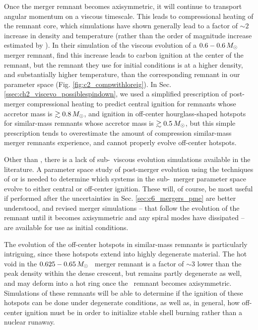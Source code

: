 Once the merger remnant becomes axisymmetric, it will continue to transport angular momentum on a viscous timescale.  This leads to compressional heating of the remnant core, which simulations \citep{schw+12, ji+13, rask+14} have shown generally lead to a factor of $\sim2$ increase in density and temperature (rather than the order of magnitude increase estimated by \citeal{vkercj10}).  In their simulation of the viscous evolution of a $0.6-0.6\,\Msun$ merger remnant, \cite{ji+13} find this increase leads to carbon ignition at the center of the remnant, but the remnant they use for initial conditions is at a higher density, and substantially higher temperature, than the corresponding remnant in our parameter space (Fig. \ref{fig:c2_compwithloreig}).  In Sec. \ref{ssec:ch2_viscevo_possiblespindown}, we used a simplified prescription of post-merger compressional heating to predict central ignition for remnants whose accretor mass is $\gtrsim0.8\,\Msun$, and ignition in off-center hourglass-shaped hotspots for similar-mass remnants whose accretor mass is $\gtrsim0.5\,\Msun$, but this simple prescription tends to overestimate the amount of compression similar-mass merger remnants experience, and cannot properly evolve off-center hotspots.

Other than \cite{ji+13}, there is a lack of sub-\Mch\ viscous evolution simulations available in the literature.  A parameter space study of post-merger evolution using the techniques of \cite{schw+12} or \cite{ji+13} is needed to determine which systems in the sub-\Mch\ merger parameter space evolve to either central or off-center ignition.  These will, of course, be most useful if performed after the uncertainties in Sec. \ref{sec:c6_mergers_pme} are better understood, and revised merger simulations -- that follow the evolution of the remnant until it becomes axisymmetric and any spiral modes have dissipated -- are available for use as initial conditions.

The evolution of the off-center hotspots in similar-mass remnants is particularly intriguing, since these hotspots extend into highly degenerate material.  The hot void in the $0.625-0.65\,\Msun$ \arepo\ merger remnant is a factor of $\sim3$ lower than the peak density within the dense crescent, but remains partly degenerate as well, and may deform into a hot ring once the \arepo\ remnant becomes axisymmetric.  Simulations of these remnants will be able to determine if the ignition of these hotspots can be done under degenerate conditions, as well as, in general, how off-center ignition must be in order to initialize stable shell burning rather than a nuclear runaway.


